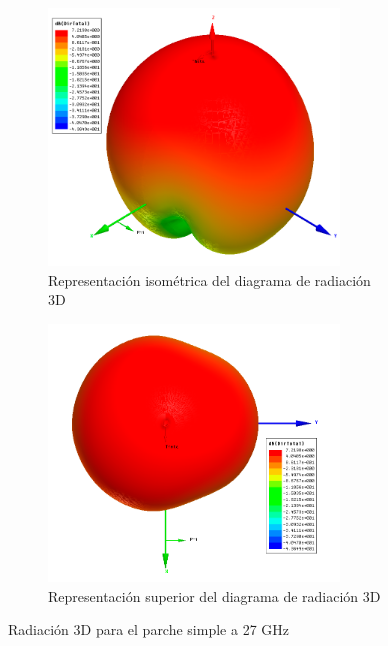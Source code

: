 \begin{figure}[H]
     \centering
     \begin{subfigure}[b]{0.75\textwidth}
         \centering
         \includegraphics[width=0.85\textwidth]{archivos/analisis/1x13/6}
         \caption{Representación isométrica del diagrama de radiación 3D}
         \label{fig:3d11x13}
     \end{subfigure}
     \hfill
     \begin{subfigure}[b]{0.75\textwidth}
         \centering
         \includegraphics[width=0.85\textwidth]{archivos/analisis/1x13/7}
         \caption{Representación superior del diagrama de radiación 3D}
         \label{fig:3d21x13}
     \end{subfigure}
     \hfill
        \caption{Radiación 3D para el parche simple a 27 GHz}
        \label{fig:3d1x13}
\end{figure}

